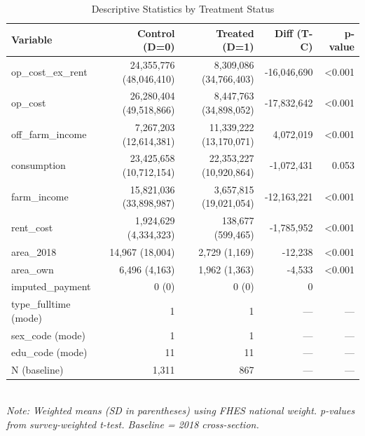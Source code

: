 \begin{table}[t]
\centering
\caption{Descriptive Statistics by Treatment Status}
\label{tab:descriptives_en}
\begin{tabular}{lrrrr}
\toprule
Variable & Control (D=0) & Treated (D=1) & Diff (T-C) & p-value \\
\midrule
op\_cost\_ex\_rent & 24,355,776 (48,046,410) & 8,309,086 (34,766,403) & -16,046,690 & <0.001 \\
op\_cost & 26,280,404 (49,518,866) & 8,447,763 (34,898,052) & -17,832,642 & <0.001 \\
off\_farm\_income & 7,267,203 (12,614,381) & 11,339,222 (13,170,071) & 4,072,019 & <0.001 \\
consumption & 23,425,658 (10,712,154) & 22,353,227 (10,920,864) & -1,072,431 & 0.053 \\
farm\_income & 15,821,036 (33,898,987) & 3,657,815 (19,021,054) & -12,163,221 & <0.001 \\
rent\_cost & 1,924,629 (4,334,323) & 138,677 (599,465) & -1,785,952 & <0.001 \\
area\_2018 & 14,967 (18,004) & 2,729 (1,169) & -12,238 & <0.001 \\
area\_own & 6,496 (4,163) & 1,962 (1,363) & -4,533 & <0.001 \\
imputed\_payment & 0 (0) & 0 (0) & 0 &  \\
type\_fulltime (mode) & 1 & 1 & --- & --- \\
sex\_code (mode) & 1 & 1 & --- & --- \\
edu\_code (mode) & 11 & 11 & --- & --- \\
N (baseline) & 1,311 & 867 & --- & --- \\
\bottomrule
\end{tabular}
\\
\footnotesize\textit{Note: Weighted means (SD in parentheses) using FHES national weight. p-values from survey-weighted t-test. Baseline = 2018 cross-section.}
\end{table}

